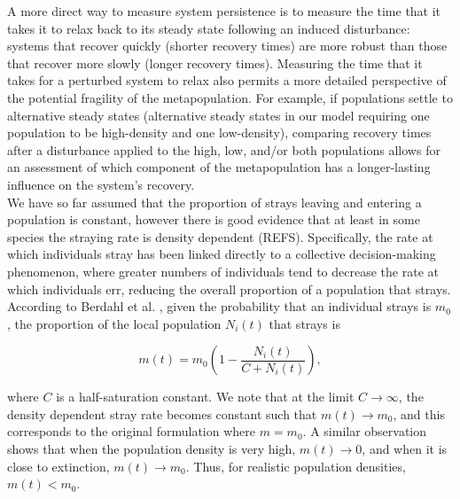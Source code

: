 \documentclass[twocolumn,preprintnumbers,amsmath,amssymb,superscriptaddress]{revtex4}
\begin{document}
A more direct way to measure system persistence is to measure the time that it takes it to relax back to its steady state following an induced disturbance: systems that recover quickly (shorter recovery times) are more robust than those that recover more slowly (longer recovery times).
Measuring the time that it takes for a perturbed system to relax also permits a more detailed perspective of the potential fragility of the metapopulation.
For example, if populations settle to alternative steady states (alternative steady states in our model requiring one population to be high-density and one low-density), comparing recovery times after a disturbance applied to the high, low, and/or both populations allows for an assessment of which component of the metapopulation has a longer-lasting influence on the system's recovery.
\\

\noindent We have so far assumed that the proportion of strays leaving and entering a population is constant, however there is good evidence that at least in some species the straying rate is density dependent (REFS).
Specifically, the rate at which individuals stray has been linked directly to a collective decision-making phenomenon, where greater numbers of individuals tend to decrease the rate at which individuals err, reducing the overall proportion of a population that strays.
According to Berdahl et al. \cite{Berdahl:2016dx}, given the probability that an individual strays is $m_0$, the proportion of the local population $N_i(t)$ that strays is

\begin{equation}
  m(t) = m_0\left(1- \frac{N_i(t)}{C+N_i(t)}\right),
  \label{eq:ddm}
\end{equation}

\noindent where $C$ is a half-saturation constant.
We note that at the limit $C\rightarrow \infty$, the density dependent stray rate becomes constant such that $m(t) \rightarrow m_0$, and this corresponds to the original formulation where $m=m_0$.
A similar observation shows that when the population density is very high, $m(t) \rightarrow 0$, and when it is close to extinction, $m(t) \rightarrow m_0$.
Thus, for realistic population densities, $m(t) < m_0$.
\end{document}
